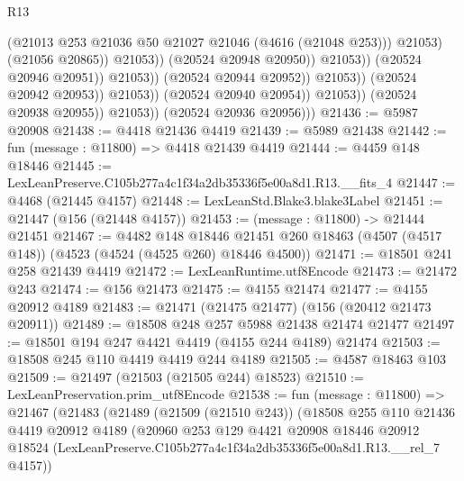 \begin{lexlean}{R13}
\begin{coremodule}
                                                    (@21013
                                                      @253
                                                      @21036
                                                      @50
                                                      @21027
                                                      @21046
                                                      (@4616 (@21048 @253)))
                                                    @21053)
                                                  (@21056 @20865))
                                                @21053))
                                            (@20524 @20948 @20950))
                                          @21053))
                                      (@20524 @20946 @20951))
                                    @21053))
                                (@20524 @20944 @20952))
                              @21053))
                          (@20524 @20942 @20953))
                        @21053))
                    (@20524 @20940 @20954))
                  @21053))
              (@20524 @20938 @20955))
            @21053))
        (@20524 @20936 @20956)))
@21436 := @5987 @20908
@21438 := @4418 @21436 @4419
@21439 := @5989 @21438
@21442 := fun (message : @11800) => @4418 @21439 @4419
@21444 := @4459 @148 @18446
@21445 := LexLeanPreserve.C105b277a4c1f34a2db35336f5e00a8d1.R13.__fits_4
@21447 := @4468 (@21445 @4157)
@21448 := LexLeanStd.Blake3.blake3Label
@21451 := @21447 (@156 (@21448 @4157))
@21453 := (message : @11800) -> @21444 @21451
@21467 := @4482
    @148
    @18446
    @21451
    @260
    @18463
    (@4507 (@4517 @148))
    (@4523 (@4524 (@4525 @260) @18446 @4500))
@21471 := @18501 @241 @258 @21439 @4419
@21472 := LexLeanRuntime.utf8Encode
@21473 := @21472 @243
@21474 := @156 @21473
@21475 := @4155 @21474
@21477 := @4155 @20912 @4189
@21483 := @21471 (@21475 @21477) (@156 (@20412 @21473 @20911))
@21489 := @18508 @248 @257 @5988 @21438 @21474 @21477
@21497 := @18501 @194 @247 @4421 @4419 (@4155 @244 @4189) @21474
@21503 := @18508 @245 @110 @4419 @4419 @244 @4189
@21505 := @4587 @18463 @103
@21509 := @21497 (@21503 (@21505 @244) @18523)
@21510 := LexLeanPreservation.prim_utf8Encode
@21538 := fun (message : @11800) =>
  @21467
    (@21483
      (@21489
        (@21509 (@21510 @243))
        (@18508
          @255
          @110
          @21436
          @4419
          @20912
          @4189
          (@20960
            @253
            @129
            @4421
            @20908
            @18446
            @20912
            @18524
            (LexLeanPreserve.C105b277a4c1f34a2db35336f5e00a8d1.R13.__rel_7 @4157))

\end{coremodule}
\end{lexlean}
